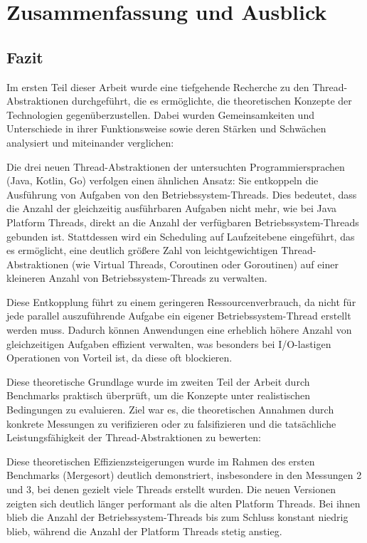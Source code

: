 \documentclass[fontsize=12pt,paper=a4,twoside=semi,parskip=half-,headsepline,headinclude]{scrreprt}
\begin{document}
\chapter{Zusammenfassung und Ausblick}

\section{Fazit}

Im ersten Teil dieser Arbeit wurde eine tiefgehende Recherche zu den Thread-Abstraktionen durchgeführt, die es ermöglichte, die theoretischen Konzepte der Technologien gegen\-über\-zu\-stellen. Dabei wurden Gemeinsamkeiten und Unterschiede in ihrer Funktionsweise sowie deren Stärken und Schwächen analysiert und miteinander verglichen:

Die drei neuen Thread-Abstraktionen der untersuchten Programmiersprachen (Java, Kotlin, Go) verfolgen einen ähnlichen Ansatz: Sie entkoppeln die Ausführung von Aufgaben von den Betriebssystem-Threads. Dies bedeutet, dass die Anzahl der gleichzeitig ausführbaren Aufgaben nicht mehr, wie bei Java Platform Threads, direkt an die Anzahl der verfügbaren Betriebssystem-Threads gebunden ist. Stattdessen wird ein Scheduling auf Laufzeitebene eingeführt, das es ermöglicht, eine deutlich größere Zahl von leichtgewichtigen Thread-Abstraktionen (wie Virtual Threads, Coroutinen oder Goroutinen) auf einer kleineren Anzahl von Betriebssystem-Threads zu verwalten.

Diese Entkopplung führt zu einem geringeren Ressourcenverbrauch, da nicht für jede parallel auszuführende Aufgabe ein eigener Betriebssystem-Thread erstellt werden muss. Dadurch können Anwendungen eine erheblich höhere Anzahl von gleichzeitigen Aufgaben effizient verwalten, was besonders bei I/O-lastigen Operationen von Vorteil ist, da diese oft blockieren.

Diese theoretische Grundlage wurde im zweiten Teil der Arbeit durch Benchmarks praktisch überprüft, um die Konzepte unter realistischen Bedingungen zu evaluieren. Ziel war es, die theoretischen Annahmen durch konkrete Messungen zu verifizieren oder zu falsifizieren und die tatsächliche Leistungsfähigkeit der Thread-Abstraktionen zu bewerten:

Diese theoretischen Effizienzsteigerungen wurde im Rahmen des ersten Benchmarks (Mergesort) deutlich demonstriert, insbesondere in den Messungen 2 und 3, bei denen gezielt viele Threads erstellt wurden. Die neuen Versionen zeigten sich deutlich länger performant als die alten Platform Threads. Bei ihnen blieb die Anzahl der Betriebssystem-Threads bis zum Schluss konstant niedrig blieb, während die Anzahl der Platform Threads stetig anstieg. 
\end{document}
